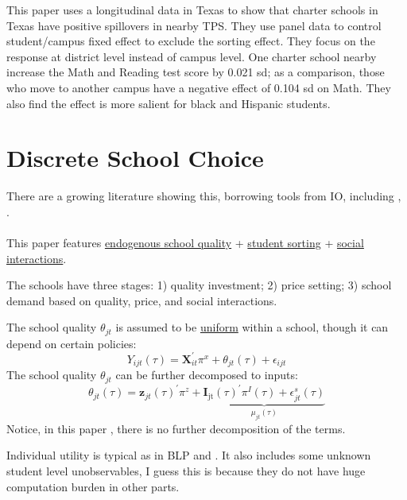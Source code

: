 This paper uses a longitudinal data in Texas to show that charter schools in Texas have positive spillovers in nearby TPS.
They use panel data to control student/campus fixed effect to exclude the sorting effect.
They focus on the response at district level instead of campus level.
One charter school nearby increase the Math and Reading test score by 0.021 sd; as a comparison, those who move to another campus have a negative effect of 0.104 sd on Math. 
They also find the effect is more salient for black and Hispanic students.


\section{Discrete School Choice} %
\label{sec:discrete school choice}

There are a growing literature showing this, borrowing tools from IO, including \citet{Neilson2018}, \citet{Allende2019}.

\paragraph{\citet[JMP]{Allende2019}}

This paper features \underline{endogenous school quality} + \underline{student sorting} + \underline{social interactions}.

The schools have three stages: 1) quality investment; 2) price setting; 3) school demand based on quality, price, and social interactions.

The school quality $\theta_{jt}$ is assumed to be \underline{uniform} within a school, though it can depend on certain policies:
\[
    Y_{i j t}(\tau)=\mathbf{X}_{i t}^{\prime} \pi^{x}+\theta_{j t}(\tau)+\epsilon_{i j t}
\]
The school quality $\theta_{jt}$ can be further decomposed to inputs:
\[
    \theta_{j t}(\tau)=\mathbf{z}_{j t}(\tau)^{\prime} \pi^{z}+\underbrace{\mathbf{I}_{\mathrm{jt}}(\tau)^{\prime} \pi^{I}(\tau)+\epsilon_{j t}^{s}(\tau)}_{\mu_{j t}(\tau)}
\]
Notice, in this paper , there is no further decomposition of the terms.


Individual utility is typical as in BLP and \citet{Neilson2018}. It also includes some unknown student level unobservables, I guess this is because they do not have huge computation burden in other parts.

